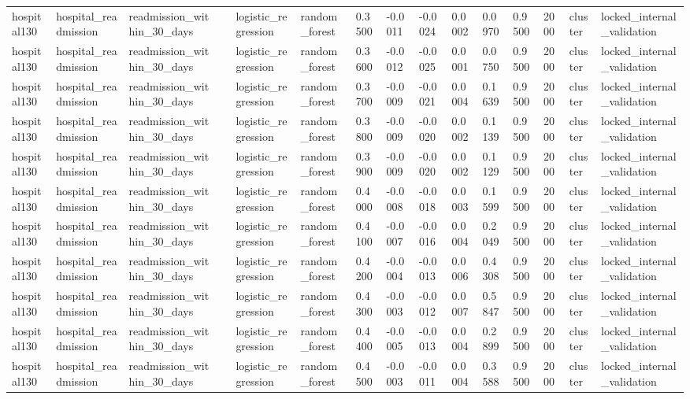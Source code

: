 \begin{tabular}{lllllllllllllll}
hospital130 & hospital\_readmission & readmission\_within\_30\_days &  & logistic\_regression & random\_forest & 0.3500 & -0.0011 & -0.0024 & 0.0002 & 0.0970 & 0.9500 & 2000 & cluster & locked\_internal\_validation \\
hospital130 & hospital\_readmission & readmission\_within\_30\_days &  & logistic\_regression & random\_forest & 0.3600 & -0.0012 & -0.0025 & 0.0001 & 0.0750 & 0.9500 & 2000 & cluster & locked\_internal\_validation \\
hospital130 & hospital\_readmission & readmission\_within\_30\_days &  & logistic\_regression & random\_forest & 0.3700 & -0.0009 & -0.0021 & 0.0004 & 0.1639 & 0.9500 & 2000 & cluster & locked\_internal\_validation \\
hospital130 & hospital\_readmission & readmission\_within\_30\_days &  & logistic\_regression & random\_forest & 0.3800 & -0.0009 & -0.0020 & 0.0002 & 0.1139 & 0.9500 & 2000 & cluster & locked\_internal\_validation \\
hospital130 & hospital\_readmission & readmission\_within\_30\_days &  & logistic\_regression & random\_forest & 0.3900 & -0.0009 & -0.0020 & 0.0002 & 0.1129 & 0.9500 & 2000 & cluster & locked\_internal\_validation \\
hospital130 & hospital\_readmission & readmission\_within\_30\_days &  & logistic\_regression & random\_forest & 0.4000 & -0.0008 & -0.0018 & 0.0003 & 0.1599 & 0.9500 & 2000 & cluster & locked\_internal\_validation \\
hospital130 & hospital\_readmission & readmission\_within\_30\_days &  & logistic\_regression & random\_forest & 0.4100 & -0.0007 & -0.0016 & 0.0004 & 0.2049 & 0.9500 & 2000 & cluster & locked\_internal\_validation \\
hospital130 & hospital\_readmission & readmission\_within\_30\_days &  & logistic\_regression & random\_forest & 0.4200 & -0.0004 & -0.0013 & 0.0006 & 0.4308 & 0.9500 & 2000 & cluster & locked\_internal\_validation \\
hospital130 & hospital\_readmission & readmission\_within\_30\_days &  & logistic\_regression & random\_forest & 0.4300 & -0.0003 & -0.0012 & 0.0007 & 0.5847 & 0.9500 & 2000 & cluster & locked\_internal\_validation \\
hospital130 & hospital\_readmission & readmission\_within\_30\_days &  & logistic\_regression & random\_forest & 0.4400 & -0.0005 & -0.0013 & 0.0004 & 0.2899 & 0.9500 & 2000 & cluster & locked\_internal\_validation \\
hospital130 & hospital\_readmission & readmission\_within\_30\_days &  & logistic\_regression & random\_forest & 0.4500 & -0.0003 & -0.0011 & 0.0004 & 0.3588 & 0.9500 & 2000 & cluster & locked\_internal\_validation \\

\end{tabular}
